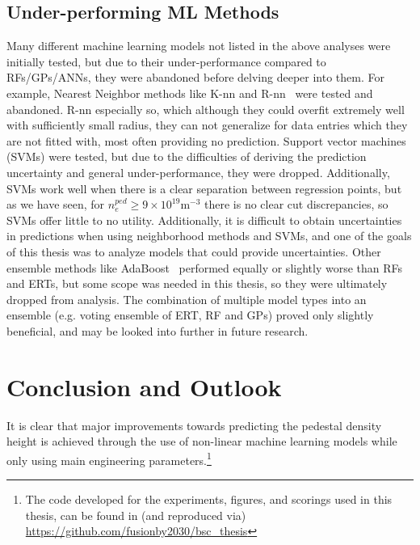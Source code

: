 \documentclass[a4paper, twoside, final, 12pt]{article}
\begin{document}
{\subsection{Under-performing ML Methods}
Many different machine learning models not listed in the above analyses were initially tested, but due to their under-performance compared to RFs/GPs/ANNs, they were abandoned before delving deeper into them. For example, Nearest Neighbor methods like K-nn and R-nn~\cite{Mucherino2009} were tested and abandoned. R-nn especially so, which although they could overfit extremely well with sufficiently small radius, they can not generalize for data entries which they are not fitted with, most often providing no prediction. Support vector machines (SVMs) \cite{hastie01statisticallearning} were tested, but due to the difficulties of deriving the prediction uncertainty and general under-performance, they were dropped. Additionally, SVMs work well when there is a clear separation between regression points, but as we have seen, for $n_e^{ped} \geq 9 \times 10^{19}\text{m}^{-3}$ there is no clear cut discrepancies, so SVMs offer little to no utility. Additionally, it is difficult to obtain uncertainties in predictions when using neighborhood methods and SVMs, and one of the goals of this thesis was to analyze models that could provide uncertainties. Other ensemble methods like AdaBoost~\cite{schapire2013explaining} performed equally or slightly worse than RFs and ERTs, but some scope was needed in this thesis, so they were ultimately dropped from analysis. The combination of multiple model types into an ensemble (e.g. voting ensemble of ERT, RF and GPs) proved only slightly beneficial, and may be looked into further in future research. 
\section{Conclusion and Outlook}

It is clear that major improvements towards predicting the pedestal density height is achieved through the use of non-linear machine learning models while only using main engineering parameters.\footnote{The code developed for the experiments, figures, and scorings used in this thesis, can be found in (and reproduced via) \url{https://github.com/fusionby2030/bsc_thesis}}

}
\end{document}
